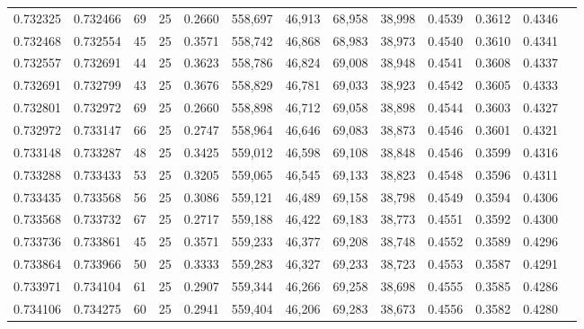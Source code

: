 \begin{tabular}{rrrrrrrrrrrrr}
0.732325 & 0.732466 &    69 &  25 &                                     0.2660 & 558,697 &  46,913 &  68,958 &  38,998 & 0.4539 & 0.3612 & 0.4346 \\
0.732468 & 0.732554 &    45 &  25 &                                     0.3571 & 558,742 &  46,868 &  68,983 &  38,973 & 0.4540 & 0.3610 & 0.4341 \\
0.732557 & 0.732691 &    44 &  25 &                                     0.3623 & 558,786 &  46,824 &  69,008 &  38,948 & 0.4541 & 0.3608 & 0.4337 \\
0.732691 & 0.732799 &    43 &  25 &                                     0.3676 & 558,829 &  46,781 &  69,033 &  38,923 & 0.4542 & 0.3605 & 0.4333 \\
0.732801 & 0.732972 &    69 &  25 &                                     0.2660 & 558,898 &  46,712 &  69,058 &  38,898 & 0.4544 & 0.3603 & 0.4327 \\
0.732972 & 0.733147 &    66 &  25 &                                     0.2747 & 558,964 &  46,646 &  69,083 &  38,873 & 0.4546 & 0.3601 & 0.4321 \\
0.733148 & 0.733287 &    48 &  25 &                                     0.3425 & 559,012 &  46,598 &  69,108 &  38,848 & 0.4546 & 0.3599 & 0.4316 \\
0.733288 & 0.733433 &    53 &  25 &                                     0.3205 & 559,065 &  46,545 &  69,133 &  38,823 & 0.4548 & 0.3596 & 0.4311 \\
0.733435 & 0.733568 &    56 &  25 &                                     0.3086 & 559,121 &  46,489 &  69,158 &  38,798 & 0.4549 & 0.3594 & 0.4306 \\
0.733568 & 0.733732 &    67 &  25 &                                     0.2717 & 559,188 &  46,422 &  69,183 &  38,773 & 0.4551 & 0.3592 & 0.4300 \\
0.733736 & 0.733861 &    45 &  25 &                                     0.3571 & 559,233 &  46,377 &  69,208 &  38,748 & 0.4552 & 0.3589 & 0.4296 \\
0.733864 & 0.733966 &    50 &  25 &                                     0.3333 & 559,283 &  46,327 &  69,233 &  38,723 & 0.4553 & 0.3587 & 0.4291 \\
0.733971 & 0.734104 &    61 &  25 &                                     0.2907 & 559,344 &  46,266 &  69,258 &  38,698 & 0.4555 & 0.3585 & 0.4286 \\
0.734106 & 0.734275 &    60 &  25 &                                     0.2941 & 559,404 &  46,206 &  69,283 &  38,673 & 0.4556 & 0.3582 & 0.4280 \\

\end{tabular}
